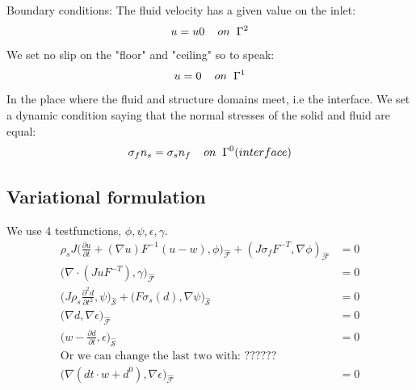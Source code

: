 Boundary conditions:
The fluid velocity has a given value on the inlet:
$$ u = u0 \hspace{4mm}on \hspace{2mm} \Gamma^2$$
We set no slip on the "floor" and "ceiling" so to speak:
$$ u = 0  \hspace{4mm}on \hspace{2mm} \Gamma^1  $$
In the place where the fluid and structure domains meet, i.e the interface. We set a dynamic condition saying that the normal stresses of the solid and fluid are equal:
$$  \sigma_f n_s = \sigma_s n_f \hspace{4mm} on  \hspace{2mm}\Gamma^0 (interface)   $$
\subsection*{Variational formulation}
We use 4 testfunctions, $\phi, \psi, \epsilon, \gamma$.
\begin{align*}
\rho_s J \big( \frac{\partial u}{\partial t} + (\nabla u)F^{-1}(u-w) , \phi\big)_{\mathcal{\hat{F}}} + (J\sigma_f F^{-T},\nabla \phi )_{\mathcal{\hat{F}}} &= 0  \\
 \big( \nabla \cdot (J u F^{-T}),\gamma \big)_{\mathcal{\hat{F}}} &= 0 \\
\big(J\rho_s \frac{\partial^2 d}{\partial t^2},\psi \big)_{\mathcal{\hat{S}}} + \big(F \sigma_s(d), \nabla \psi \big)_{\mathcal{\hat{S}}} &=0 \\
 \big( \nabla d , \nabla \epsilon \big)_{\mathcal{\hat{F}}} &= 0 \\
 \big( w- \frac{\partial d}{\partial t} ,\epsilon \big)_{\mathcal{\hat{S}}} &= 0 \\
 \text{Or we can change the last two with:  ??????} & \\ 
 \big( \nabla (dt\cdot w + d^0) , \nabla \epsilon \big)_{\mathcal{\hat{F}}} &= 0 
\end{align*}



